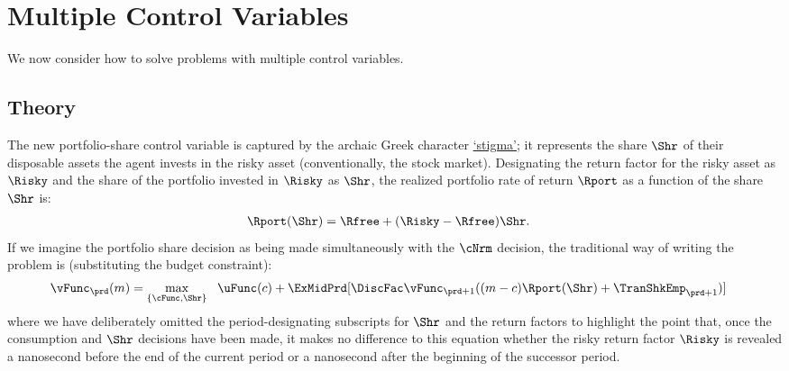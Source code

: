 \documentclass[\econtexRoot/SolvingMicroDSOPs]{subfiles}
\begin{document}
\hypertarget{multiple-control-variables}{}
\section{Multiple Control Variables}\label{sec:multiple-control-variables}
We now consider how to solve problems with multiple control variables.  

\subsection{Theory}\label{subsec:MCTheory}

The new portfolio-share control variable is captured by the archaic Greek character \href{https://en.wikipedia.org/wiki/Stigma_(ligature)}{`stigma'}; it represents the share $\Shr$ of their disposable assets the agent invests in the risky asset (conventionally, the stock market).  Designating the return factor for the risky asset as $\Risky$ and the share of the portfolio invested in $\Risky$ as $\Shr$, the realized portfolio rate of return $\Rport$ as a function of the share $\Shr$ is:
\begin{equation}\begin{gathered}\begin{aligned}
      \Rport(\Shr) &= \Rfree+(\Risky-\Rfree)\Shr \label{eq:Shr}.
    \end{aligned}\end{gathered}\end{equation}
If we imagine the portfolio share decision as being made simultaneously with the $\cNrm$ decision, the traditional way of writing the problem is (substituting the budget constraint):
\begin{equation}\begin{gathered}\begin{aligned}
      \vFunc_{\prd}(m)  & = \max_{\{\cFunc,\Shr\}} ~~  \uFunc(c) + \ExMidPrd[\DiscFac \vFunc_{\prd+1}((m-c)\Rport(\Shr) + {\TranShkEmp}_{\prd+1})] \label{eq:Bellmanundated}
    \end{aligned}\end{gathered}\end{equation}
where we have deliberately omitted the {period}-designating subscripts for $\Shr$ and the return factors to highlight the point that, once the consumption and $\Shr$ decisions have been made, it makes no difference to this equation whether the risky return factor $\Risky$ is revealed a nanosecond before the end of the current {period} or a nanosecond after the beginning of the successor {period}.
\end{document}
